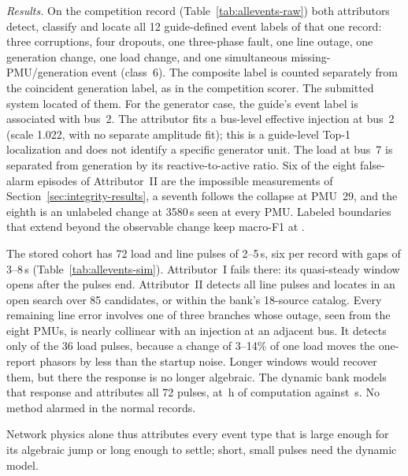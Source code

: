 \emph{Results.} On the competition record (Table~\ref{tab:allevents-raw})
both attributors detect, classify and locate all 12 guide-defined event
labels of that one record: three corruptions, four dropouts, one
three-phase fault, one line outage, one generation change, one load
change, and one simultaneous missing-PMU/generation event (class~6).
The composite label is counted separately from the coincident generation
label, as in the competition scorer. The submitted system located
\AERawSubTopone{} of them. For the generator case, the guide's event label
is associated with bus~2. The attributor fits a bus-level effective
injection at bus~2 (scale 1.022, with no separate amplitude fit); this is
a guide-level Top-1 localization and does not identify a specific
generator unit.
The load at bus~7 is separated from generation by its
reactive-to-active ratio. Six of the eight false-alarm episodes of
Attributor~II are the impossible measurements of
Section~\ref{sec:integrity-results}, a seventh follows the collapse at
PMU~29, and the eighth is an unlabeled change at 3580\,s seen at every
PMU. Labeled boundaries that extend beyond the
observable change keep macro-F1 at \AERawTwoMacro{}.



The stored cohort has 72 load and line pulses of 2--5\,s, six per record
with gaps of 3--8\,s (Table~\ref{tab:allevents-sim}). Attributor~I fails
there: its quasi-steady window opens after the pulses end. Attributor~II
detects all \AESimLineDet{} line pulses and locates \AESimLineTopone{}
in an open search over 85 candidates, or \AESimCatLineTopone{} within
the bank's 18-source catalog. Every remaining line error involves one of
three branches whose outage, seen from the eight PMUs, is nearly
collinear with an injection at an adjacent bus. It detects only
\AESimLoadDet{} of the 36 load pulses, because a change of 3--14\% of one
load moves the one-report phasors by less than the startup noise. Longer
windows would recover them, but there the response is no longer
algebraic. The dynamic bank models that response and attributes all 72
pulses, at \AEWallBankH\,h of computation against \AEWallTwo\,s. No
method alarmed in the normal records.

Network physics alone thus attributes every event type that is large
enough for its algebraic jump or long enough to settle; short, small
pulses need the dynamic model.
